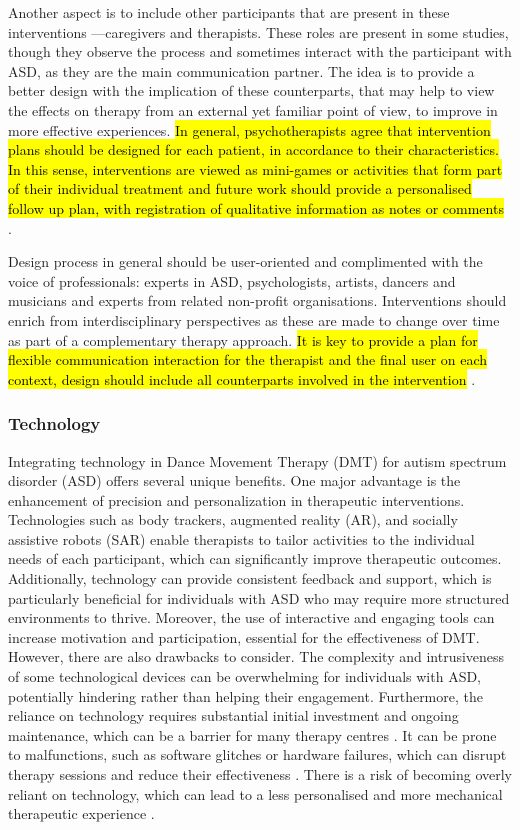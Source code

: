 \documentclass[a4paper,fleqn]{cas-sc}
\begin{document}
Another aspect is to include other participants that are present in these interventions —caregivers and therapists. These roles are present in some studies, though they observe the process and sometimes interact with the participant with ASD, as they are the main communication partner. The idea is to provide a better design with the implication of these counterparts, that may help to view the effects on therapy from an external yet familiar point of view, to improve in more effective experiences. \hl{In general, psychotherapists agree that intervention plans should be designed for each patient, in accordance to their characteristics. In this sense, interventions are viewed as mini-games or activities that form part of their individual treatment and future work should provide a personalised follow up plan, with registration of qualitative information as notes or comments } \cite{Raygoza-Romero21}.

Design process in general should be user-oriented and complimented with the voice of professionals: experts in ASD, psychologists, artists, dancers and musicians and experts from related non-profit organisations. Interventions should enrich from interdisciplinary perspectives as these are made to change over time as part of a complementary therapy approach. \hl{It is key to provide a plan for flexible communication interaction for the therapist and the final user on each context, design should include all counterparts involved in the intervention} \cite{Castelhano17}. 

\subsubsection{Technology}

Integrating technology in Dance Movement Therapy (DMT) for autism spectrum disorder (ASD) offers several unique benefits. One major advantage is the enhancement of precision and personalization in therapeutic interventions. Technologies such as body trackers, augmented reality (AR), and socially assistive robots (SAR) enable therapists to tailor activities to the individual needs of each participant, which can significantly improve therapeutic outcomes. Additionally, technology can provide consistent feedback and support, which is particularly beneficial for individuals with ASD who may require more structured environments to thrive. Moreover, the use of interactive and engaging tools can increase motivation and participation, essential for the effectiveness of DMT. However, there are also drawbacks to consider. The complexity and intrusiveness of some technological devices can be overwhelming for individuals with ASD, potentially hindering rather than helping their engagement. Furthermore, the reliance on technology requires substantial initial investment and ongoing maintenance, which can be a barrier for many therapy centres \cite{Berenguer2020, Kouroupa2022}. It can be prone to malfunctions, such as software glitches or hardware failures, which can disrupt therapy sessions and reduce their effectiveness \cite{Boucenna2014}. There is a risk of becoming overly reliant on technology, which can lead to a less personalised and more mechanical therapeutic experience \cite{Maskey2014}.
\end{document}

